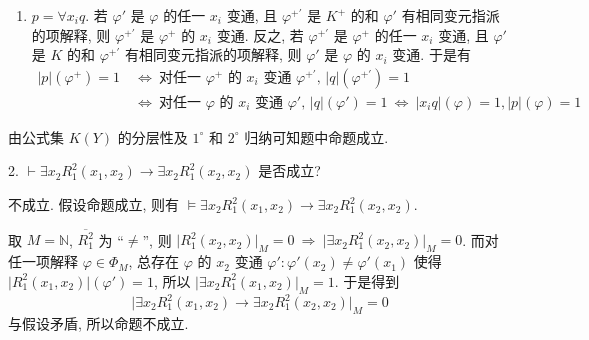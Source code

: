 \documentclass[boxes]{homework}
\begin{document}
\begin{solution}
\begin{enumerate}[label = $\arabic*^\circ$, parsep = 0pt, itemsep = 0pt, topsep = .1em]
\begin{enumerate}[label = (\arabic*), parsep = 0pt, itemsep = 0pt, topsep = .1em]
            \item $p = \forall x_i q$. 若 $\varphi'$ 是 $\varphi$ 的任一 $x_i$ 变通, 且 $\varphi^{+'}$ 是 $K^+$ 的和 $\varphi'$ 有相同变元指派的项解释, 则 $\varphi^{+'}$ 是 $\varphi^+$ 的 $x_i$ 变通. 反之, 若 $\varphi^{+'}$ 是 $\varphi^+$ 的任一 $x_i$ 变通, 且 $\varphi'$ 是 $K$ 的和 $\varphi^{+'}$ 有相同变元指派的项解释, 则 $\varphi'$ 是 $\varphi$ 的 $x_i$ 变通. 于是有
            \begin{align*}
                \lvert p\rvert(\varphi^+) = 1\ &\Leftrightarrow\ \text{对任一 $\varphi^+$ 的 $x_i$ 变通 $\varphi^{+'}$, $\lvert q\rvert(\varphi^{+'}) = 1$}\\
                &\Leftrightarrow\ \text{对任一 $\varphi$ 的 $x_i$ 变通 $\varphi'$, $\lvert q\rvert(\varphi') = 1$}\ \Leftrightarrow\ \lvert x_i q\rvert(\varphi) = 1, \lvert p\rvert(\varphi) = 1
            \end{align*}
        \end{enumerate}
    \end{enumerate}
    由公式集 $K(Y)$ 的分层性及 $1^\circ$ 和 $2^\circ$ 归纳可知题中命题成立.
\end{solution}

\begin{problem}
2. $\vdash \exists x_2 R_1^2(x_1, x_2)\to \exists x_2 R_1^2(x_2, x_2)$ 是否成立?
\end{problem}

\begin{solution}
    不成立. 假设命题成立, 则有 $\vDash \exists x_2 R_1^2(x_1, x_2)\to \exists x_2 R_1^2(x_2, x_2)$. 
    
    取 $M = \mathbb{N}$, $\overline{R_1^2}$ 为 ``$\neq$'', 则 $\lvert R_1^2(x_2, x_2)\rvert_M = 0\ \Rightarrow\ \lvert\exists x_2 R_1^2(x_2, x_2)\rvert_M = 0$. 而对任一项解释 $\varphi\in\Phi_M$, 总存在 $\varphi$ 的 $x_2$ 变通 $\varphi': \varphi'(x_2)\neq\varphi'(x_1)$ 使得 $\lvert R_1^2(x_1, x_2)\rvert(\varphi') = 1$, 所以 $\lvert\exists x_2 R_1^2(x_1, x_2)\rvert_M = 1$. 于是得到
    $$
        \lvert\exists x_2 R_1^2(x_1, x_2)\to \exists x_2 R_1^2(x_2, x_2)\rvert_M = 0
    $$
    与假设矛盾, 所以命题不成立.
\end{solution}
\end{document}

